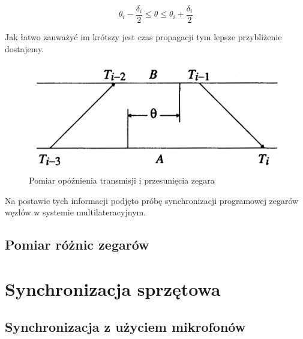 \[\theta_i - \frac{\delta_i}{2} \leq \theta \leq \theta_i + \frac{\delta_i}{2}\]

Jak łatwo zauważyć im krótszy jest czas propagacji tym lepsze przybliżenie dostajemy.

\begin{figure}
    \includegraphics[width=\textwidth]{pics/ntp.png}
\caption{Pomiar opóźnienia transmisji i przesunięcia zegara}
\label{fig:ntp}
\end{figure}

Na postawie tych informacji podjęto próbę synchronizacji programowej zegarów węzłów w systemie multilateracyjnym.

\subsection{Pomiar różnic zegarów}



\section{Synchronizacja sprzętowa}

\subsection{Synchronizacja z użyciem mikrofonów}
